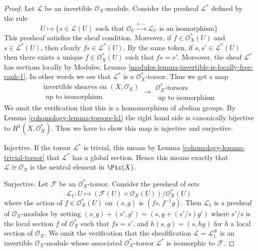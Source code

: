 \begin{proof}

Let $\mathcal{L}$ be an invertible $\mathcal{O}_X$-module.
Consider the presheaf $\mathcal{L}^*$ defined by the rule
$$
U \longmapsto \{s \in \mathcal{L}(U)
\text{ such that } \mathcal{O}_U \xrightarrow{s \cdot -} \mathcal{L}_U
\text{ is an isomorphism}\}
$$
This presheaf satisfies the sheaf condition. Moreover, if
$f \in \mathcal{O}_X^*(U)$ and $s \in \mathcal{L}^*(U)$, then clearly
$fs \in \mathcal{L}^*(U)$. By the same token, if $s, s' \in \mathcal{L}^*(U)$
then there exists a unique $f \in \mathcal{O}_X^*(U)$ such that
$fs = s'$. Moreover, the sheaf $\mathcal{L}^*$ has sections locally
by Modules, Lemma \ref{modules-lemma-invertible-is-locally-free-rank-1}.
In other words we
see that $\mathcal{L}^*$ is a $\mathcal{O}_X^*$-torsor. Thus we get
a map
$$
\begin{matrix}
\text{invertible sheaves on }(X, \mathcal{O}_X) \\
\text{ up to isomorphism}
\end{matrix}
\longrightarrow
\begin{matrix}
\mathcal{O}_X^*\text{-torsors} \\
\text{ up to isomorphism}
\end{matrix}
$$
We omit the verification that this is a homomorphism of abelian groups.
By
Lemma \ref{cohomology-lemma-torsors-h1}
the right hand side is canonically
bijective to $H^1(X, \mathcal{O}_X^*)$.
Thus we have to show this map is injective and surjective.

\medskip\noindent
Injective. If the torsor $\mathcal{L}^*$ is trivial, this means by
Lemma \ref{cohomology-lemma-trivial-torsor}
that $\mathcal{L}^*$ has a global section.
Hence this means exactly that $\mathcal{L} \cong \mathcal{O}_X$ is
the neutral element in $\Pic(X)$.

\medskip\noindent
Surjective. Let $\mathcal{F}$ be an $\mathcal{O}_X^*$-torsor.
Consider the presheaf of sets
$$
\mathcal{L}_1 : U \longmapsto
(\mathcal{F}(U) \times \mathcal{O}_X(U))/\mathcal{O}_X^*(U)
$$
where the action of $f \in \mathcal{O}_X^*(U)$ on
$(s, g)$ is $(fs, f^{-1}g)$. Then $\mathcal{L}_1$ is a presheaf
of $\mathcal{O}_X$-modules by setting
$(s, g) + (s', g') = (s, g + (s'/s)g')$ where $s'/s$ is the local
section $f$ of $\mathcal{O}_X^*$ such that $fs = s'$, and
$h(s, g) = (s, hg)$ for $h$ a local section of $\mathcal{O}_X$.
We omit the verification that the sheafification
$\mathcal{L} = \mathcal{L}_1^\#$ is an invertible $\mathcal{O}_X$-module
whose associated $\mathcal{O}_X^*$-torsor $\mathcal{L}^*$ is isomorphic
to $\mathcal{F}$.
\end{proof}

